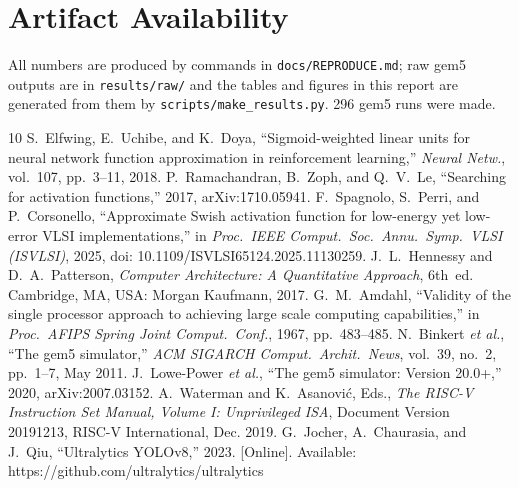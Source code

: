 \documentclass[conference]{IEEEtran}
\begin{document}
\section{Artifact Availability}
All numbers are produced by commands in \texttt{docs/REPRODUCE.md}; raw gem5 outputs are in \texttt{results/raw/} and the tables and figures in this report are generated from them by \texttt{scripts/make\_results.py}. 296 gem5 runs were made.

\begin{thebibliography}{10}
 S.~Elfwing, E.~Uchibe, and K.~Doya, ``Sigmoid-weighted linear units for neural network function approximation in reinforcement learning,'' \emph{Neural Netw.}, vol.~107, pp.~3--11, 2018.
 P.~Ramachandran, B.~Zoph, and Q.~V.~Le, ``Searching for activation functions,'' 2017, arXiv:1710.05941.
 F.~Spagnolo, S.~Perri, and P.~Corsonello, ``Approximate Swish activation function for low-energy yet low-error VLSI implementations,'' in \emph{Proc.\ IEEE Comput.\ Soc.\ Annu.\ Symp.\ VLSI (ISVLSI)}, 2025, doi: 10.1109/ISVLSI65124.2025.11130259.
 J.~L.~Hennessy and D.~A.~Patterson, \emph{Computer Architecture: A Quantitative Approach}, 6th~ed. Cambridge, MA, USA: Morgan Kaufmann, 2017.
 G.~M.~Amdahl, ``Validity of the single processor approach to achieving large scale computing capabilities,'' in \emph{Proc.\ AFIPS Spring Joint Comput.\ Conf.}, 1967, pp.~483--485.
 N.~Binkert \emph{et al.}, ``The gem5 simulator,'' \emph{ACM SIGARCH Comput.\ Archit.\ News}, vol.~39, no.~2, pp.~1--7, May 2011.
 J.~Lowe-Power \emph{et al.}, ``The gem5 simulator: Version 20.0+,'' 2020, arXiv:2007.03152.
 A.~Waterman and K.~Asanovi\'c, Eds., \emph{The RISC-V Instruction Set Manual, Volume I: Unprivileged ISA}, Document Version 20191213, RISC-V International, Dec. 2019.
 G.~Jocher, A.~Chaurasia, and J.~Qiu, ``Ultralytics YOLOv8,'' 2023. [Online]. Available: https://github.com/ultralytics/ultralytics
\end{thebibliography}
\end{document}
